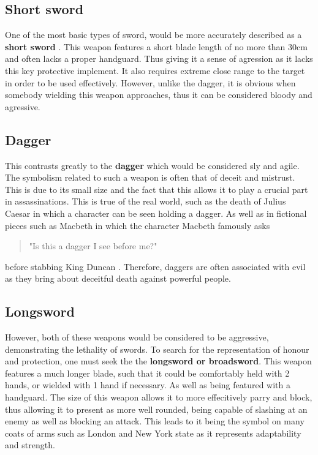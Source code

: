 \documentclass{article}
\begin{document}
\subsection*{Short sword}
One of the most basic types of sword, would be more accurately described as a \textbf{short sword} \parencite{mcnab2010swords}. This weapon features a short blade length of no more than 30cm and often lacks a proper handguard. Thus giving it a sense of agression as it lacks this key protective implement. It also requires extreme close range to the target in order to be used effectively. However, unlike the dagger, it is obvious when somebody wielding this weapon approaches, thus it can be considered bloody and agressive.

\subsection*{Dagger}
This contrasts greatly to the \textbf{dagger} which would be considered sly and agile. The symbolism related to such a weapon is often that of deceit and mistrust. This is due to its small size and the fact that this allows it to play a crucial part in assassinations. This is true of the real world, such as the death of Julius Caesar \parencite{caesar} in which a character can be seen holding a dagger. As well as in fictional pieces such as Macbeth in which the character Macbeth famously asks \begin{quote}
    "Is this a dagger I see before me?"
\end{quote}
before stabbing King Duncan \parencite{macbeth}. Therefore, daggers are often associated with evil as they bring about deceitful death against powerful people.

\subsection*{Longsword}
However, both of these weapons would be considered to be aggressive, demonstrating the lethality of swords. To search for the representation of honour and protection, one must seek the the \textbf{longsword or broadsword}. This weapon features a much longer blade, such that it could be comfortably held with 2 hands, or wielded with 1 hand if necessary. As well as being featured with a handguard. The size of this weapon allows it to more effecitively parry and block, thus allowing it to present as more well rounded, being capable of slashing at an enemy as well as blocking an attack. This leads to it being the symbol on many coats of arms such as London \parencite{fox1894book} and New York state \parencite{newyorkflag} as it represents adaptability and strength.


\pagebreak


\printbibliography
\end{document}
